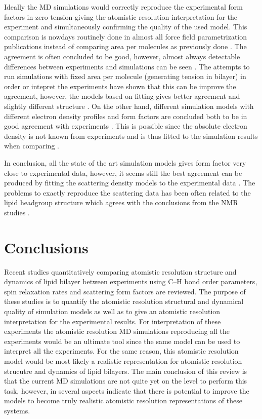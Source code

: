 \documentclass[aps,prl,superscriptaddress,twocolumn]{revtex4}
\begin{document}
Ideally the MD simulations would correctly reproduce the experimental form factors in zero tension
giving the atomistic resolution interpretation for the experiment and simultaneously confirming the
quality of the used model. This comparison is nowdays routinely done in almost all force field parametrization
publications instead of comparing area per molecules as previously done \cite{??}. 
The agreement is often concluded to be good, however, almost always detectable differences
between experiments and simulations can be seen \cite{??}. The attempts to run simulations 
with fixed area per molecule (generating tension in bilayer) in order or intepret the experiments
have shown that this can be improve the agreement, however, the models based on fitting gives
better agreement and slightly different structure \cite{??}. On the other hand, different simulation
models with different electron density profiles and form factors are concluded both to be in good 
agreement with experiments \cite{??}. This is possible since the absolute electron density is not
known from experiments and is thus fitted to the simulation results when comparing \cite{??}. 

In conclusion, all the state of the art simulation models gives form factor very close to experimental
data, however, it seems still the best agreement can be produced by fitting the scattering density models
to the experimental data \cite{??}. The problems to exactly reproduce the scattering data has been often 
related to the lipid headgroup structure which agrees with the conclusions from the NMR studies \cite{??}.





\section{Conclusions}

Recent studies quantitatively comparing atomistic resolution structure and dynamics of lipid
bilayer between experiments using C--H bond order parameters, spin relaxation rates and
scattering form factors are reviewed. The purpose of these studies is to quantify the atomistic
resolution structural and dynamical quality of simulation models as well as to give an 
atomistic resolution interpretation for the experimental results. For interpretation of
these experiments the atomistic resolution MD simulations reproducing all the experiments would be
an ultimate tool since the same model can be used to interpret all the experiments. For the same 
reason, this atomistic resolution model would be most likely a realistic representation for
atomistic resolution strucutre and dynamics of lipid bilayers. The main conclusion of this
review is that the current MD simulations are not quite yet on the level to perform this task,
however, in several aspects indicate that there is potential to improve the models to become 
truly realistic atomistic resolution representations of these systems. 
\end{document}
